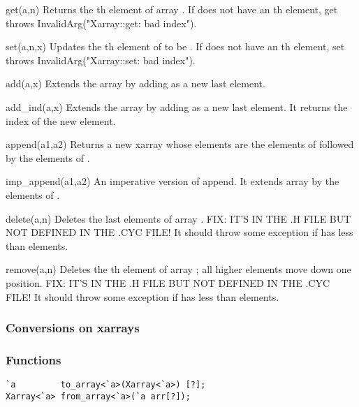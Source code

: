 \begin{defun}{get}{(a,n)}
Returns the th element of array .  If  does not
have an th element, get throws InvalidArg("Xarray::get: bad
index").
\end{defun}

\begin{defun}{set}{(a,n,x)}
Updates the th element of  to be .  If  does
not have an th element, set throws InvalidArg("Xarray::set: bad
index").
\end{defun}

\begin{defun}{add}{(a,x)}
Extends the array  by adding  as a new last element.
\end{defun}

\begin{defun}{add_ind}{(a,x)}
Extends the array  by adding  as a new last element.  It
returns the index of the new element.
\end{defun}

\begin{defun}{append}{(a1,a2)}
Returns a new xarray whose elements are the elements of 
followed by the elements of .
\end{defun}

\begin{defun}{imp_append}{(a1,a2)}
An imperative version of append.  It extends array  by the
elements of .
\end{defun}

\begin{defun}{delete}{(a,n)}
Deletes the last  elements of array .  FIX: IT'S IN THE .H
FILE BUT NOT DEFINED IN THE .CYC FILE!  It should throw some exception
if  has less than  elements.
\end{defun}


\begin{defun}{remove}{(a,n)}
Deletes the th element of array ; all higher elements move
down one position.  FIX: IT'S IN THE .H FILE BUT NOT DEFINED IN THE .CYC
FILE!  It should throw some exception if  has less than 
elements.
\end{defun}

\subsubsection*{Conversions on xarrays}
\subsubsection*{Functions}
\begin{verbatim}
`a         to_array<`a>(Xarray<`a>) [?];
Xarray<`a> from_array<`a>(`a arr[?]);
\end{verbatim}

